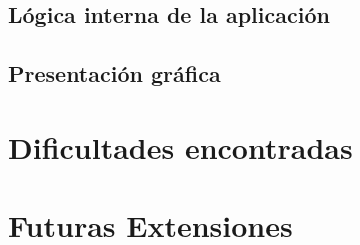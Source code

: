 \documentclass[a4paper,10pt]{article}
\begin{document}
\subsection{Lógica interna de la aplicación}

\subsection{Presentación gráfica}

\newpage

\section{Dificultades encontradas}
\newpage

\section{Futuras Extensiones}
   
\end{document}
